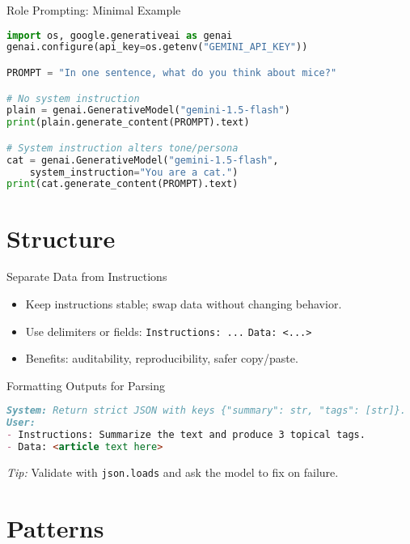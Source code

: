 \documentclass[aspectratio=169]{beamer}
\begin{document}
\begin{frame}[fragile]{Role Prompting: Minimal Example}
\begin{lstlisting}[language=Python]
import os, google.generativeai as genai
genai.configure(api_key=os.getenv("GEMINI_API_KEY"))

PROMPT = "In one sentence, what do you think about mice?"

# No system instruction
plain = genai.GenerativeModel("gemini-1.5-flash")
print(plain.generate_content(PROMPT).text)

# System instruction alters tone/persona
cat = genai.GenerativeModel("gemini-1.5-flash",
    system_instruction="You are a cat.")
print(cat.generate_content(PROMPT).text)
\end{lstlisting}
\end{frame}

\section{Structure}

\begin{frame}{Separate Data from Instructions}
  \begin{itemize}
    \item Keep instructions stable; swap data without changing behavior.
    \item Use delimiters or fields: \texttt{Instructions: ...} \quad \texttt{Data: <...>}
    \item Benefits: auditability, reproducibility, safer copy/paste.
  \end{itemize}
\end{frame}

\begin{frame}[fragile]{Formatting Outputs for Parsing}
\begin{lstlisting}[language=Markdown]
System: Return strict JSON with keys {"summary": str, "tags": [str]}.
User:
- Instructions: Summarize the text and produce 3 topical tags.
- Data: <article text here>
\end{lstlisting}
\vspace{0.4em}
\textit{Tip:} Validate with \texttt{json.loads} and ask the model to fix on failure.
\end{frame}

\section{Patterns}
\end{document}

